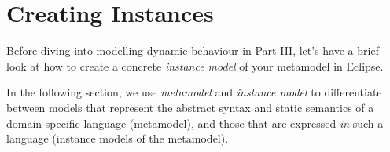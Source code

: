 \newpage
\genHeader

\section{Creating Instances}
\hypertarget{sec:creatingInstance common}{}

Before diving into modelling dynamic behaviour in Part III, let's have a brief look at how to create a concrete \emph{instance model} of your metamodel
in Eclipse.

In the following section, we use \emph{metamodel} and \emph{instance model} to differentiate between models that represent the abstract syntax and static
semantics of a domain specific language (metamodel), and those that are expressed \emph{in} such a language (instance models of the metamodel).

